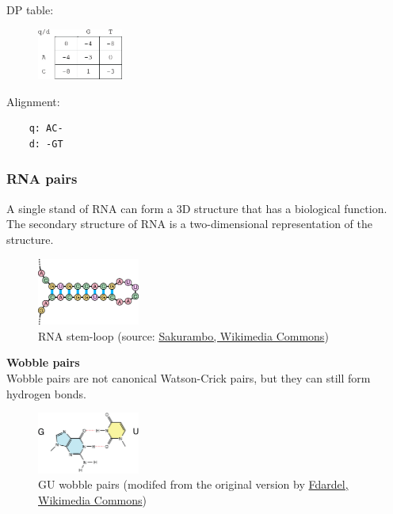 \begin{multicols}{2}
DP table:
\begin{figure}[H]
  \centering
      \includegraphics[width=0.25\textwidth]{fig03/example_watson_crick_alignment.png}
\end{figure}

Alignment:
\begin{verbatim}
    q: AC-
    d: -GT
\end{verbatim}

\end{multicols} 

%
%
\subsubsection*{RNA pairs}
A single stand of RNA can form a 3D structure that has a biological function. The secondary structure of RNA is a two-dimensional representation of the structure. 

\begin{figure}[H]
  \centering
      \includegraphics[width=0.3\textwidth]{fig03/rna_stem_loop.png}
  \caption{RNA stem-loop (source: \href{https://commons.wikimedia.org/w/index.php?curid=815268}{Sakurambo, Wikimedia Commons})}
\end{figure}

\noindent \textbf{Wobble pairs} \\
\noindent Wobble pairs are not canonical Watson-Crick pairs, but they can still form hydrogen bonds.

\begin{figure}[H]
  \centering
      \includegraphics[width=0.3\textwidth]{fig03/rna_gu_wobble.png}
  \caption{GU wobble pairs \newline (modifed from the original version by \href{https://commons.wikimedia.org/w/index.php?curid=2636730}{Fdardel, Wikimedia Commons})}
\end{figure}

